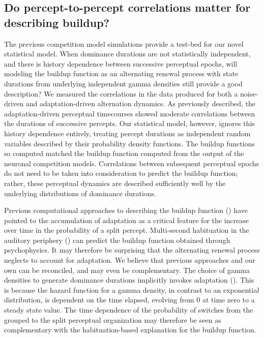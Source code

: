 \documentclass{frontiersSCNS} %
\begin{document}
\subsection{Do percept-to-percept correlations matter for describing buildup?}

The previous competition model simulations provide a test-bed for our novel statistical model. When dominance durations are not statistically independent, and there is history dependence between successive perceptual epochs, will modeling the buildup function as an alternating renewal process with state durations from underlying independent gamma densities still provide a good description? We measured the correlations in the data produced for both a noise-driven and adaptation-driven alternation dynamics. As previously described, the adaptation-driven perceptual timecourses showed moderate correlations between the durations of successive percepts. Our statistical model, however, ignores this history dependence entirely, treating percept durations as independent random variables described by their probability density functions. The buildup functions so computed matched the buildup function computed from the output of the neuronal competition models. Correlations between subsequent perceptual epochs do not need to be taken into consideration to predict the buildup function; rather, these perceptual dynamics are described sufficiently well by the underlying distributions of dominance durations.

Previous computational approaches to describing the buildup function (\cite{Micheyl2005, Pressnitzer2008}) have pointed to the accumulation of adaptation as a critical feature for the increase over time in the probability of a split percept. Multi-second habituation in the auditory periphery (\cite{Pressnitzer2008}) can predict the buildup function obtained through psychophysics. It may therefore be surprising that the alternating renewal process neglects to account for adaptation. We believe that previous approaches and our own can be reconciled, and may even be complementary. The choice of gamma densities to generate dominance durations implicitly invokes adaptation (\cite{Wilbur1982}). This is because the hazard function for a gamma density, in contrast to an exponential distribution, is dependent on the time elapsed, evolving from 0 at time zero to a steady state value. The time dependence of the probability of switches from the grouped to the split perceptual organization may therefore be seen as complementary with the habituation-based explanation for the buildup function. 
\end{document}
